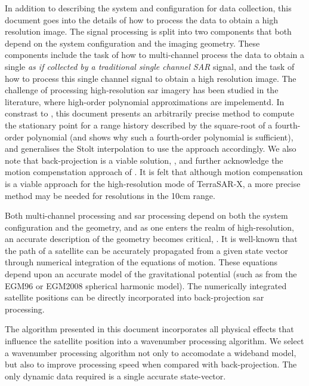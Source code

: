 In addition to describing the system and configuration for data collection, this document goes into the details of how to process the data to obtain a high resolution image. The signal processing is split into two components that both depend on the system configuration and the imaging geometry. These components include the task of how to multi-channel process the data to obtain a single {\em as if collected by a traditional single channel SAR} signal, and the task of how to process this single channel signal to obtain a high resolution image. The challenge of processing high-resolution \gls{sar} imagery has been studied in the literature, \cite{Luo2014, Meng2018, Edelhust2017, Zhao2014, Wu2016, Wang2015} where high-order polynomial approximations are impelementd. In constrast to \cite{Wang2015, Wu2016, Zhao2014, Luo2014}, this document presents an arbitrarily precise method to compute the stationary point for a range history described by the square-root of a fourth-order polynomial (and shows why such a fourth-order polynomial is sufficient), and generalises the Stolt interpolation to use the approach accordingly. We also note that back-projection is a viable solution, \cite{RodriguezCassola2019}, and further acknowledge the motion compenstation approach of  \cite{Prats2014}. It is felt that although motion compensation is a viable approach for the high-resolution mode of TerraSAR-X, a more precise method may be needed for resolutions in the 10cm range. 
\par
Both multi-channel processing and \gls{sar} processing depend on both the system configuration and the geometry, and as one enters the realm of high-resolution, an accurate description of the geometry becomes critical, \cite{Luo2014, Meng2018, Edelhust2017, Prats2014, Zhao2014, Wu2016}. It is well-known that the path of a satellite can be accurately propagated from a given state vector through numerical integration of the equations of motion. These equations depend upon an accurate model of the gravitational potential (such as from the EGM96 or EGM2008 spherical harmonic model). The numerically integrated satellite positions can be directly incorporated into back-projection \gls{sar} processing. 
\par
The algorithm presented in this document incorporates all physical effects that influence the satellite position into a wavenumber processing algorithm. We select a wavenumber processing algorithm not only to accomodate a wideband model, but also to improve processing speed when compared with back-projection. The only dynamic data required is a single accurate state-vector. 
